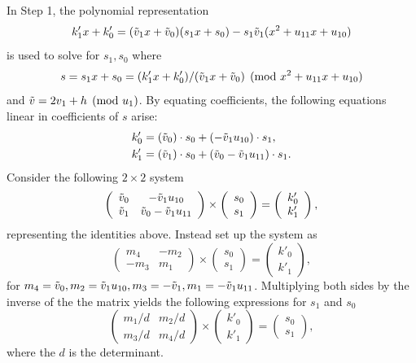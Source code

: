 In Step 1, the polynomial representation $$ k'_1x + k'_0 =
(\tilde{v}_1x + \tilde{v}_0)(s_1x + s_0) - s_1\tilde{v}_1(x^2 + u_{11}x + u_{10})$$ is used to
solve for $s_1,s_0$ where $$s = s_1x + s_0 = (k'_1x + k'_0)/(\tilde{v}_1x + \tilde{v}_0)
\pmod{x^2 + u_{11}x + u_{10}}$$ and $\tilde{v} = 2v_1 + h \pmod{u_1}$. By equating
coefficients, the following equations linear in coefficients of $s$ arise:  
\begin{align*} k'_0 &=
(\tilde{v}_0) \cdot s_0 + (-\tilde{v}_1u_{10}) \cdot s_1, \\
k'_1 &= (\tilde{v}_1) \cdot s_0 + (\tilde{v}_0 - \tilde{v}_1u_{11}) \cdot s_1.
\end{align*}
Consider the following $2 \times 2$ system $$ \left( \begin{array}{cc}
\tilde{v}_0 & -\tilde{v}_1u_{10}   \\
\tilde{v}_1 & \tilde{v}_0 -\tilde{v}_1u_{11}   \end{array} \right) \times \left( \begin{array}{c}
s_0   \\
s_1   \end{array} \right) = \left( \begin{array}{c}
k'_0   \\
k'_1   \end{array} \right), $$  representing the identities above. Instead 
set up the system  as $$ \left( \begin{array}{cc}
m_4 & -m_2   \\
-m_3 & m_1   \end{array} \right) \times \left( \begin{array}{c}
s_0   \\
s_1   \end{array} \right) = \left( \begin{array}{c}
k'_0   \\
k'_1   \end{array} \right),$$ for $m_4 = \tilde{v}_0, m_2 = \tilde{v}_1u_{10}, m_3 = -\tilde{v}_1,
m_1 = -\tilde{v}_1u_{11}$. Multiplying both sides by the inverse of the the matrix
yields the following expressions for $s_1$ and $s_0$ $$ \left( \begin{array}{cc}
m_1/d & m_2/d   \\
m_3/d & m_4/d   \end{array} \right) \times \left( \begin{array}{c}
k'_0   \\
k'_1   \end{array} \right) = \left( \begin{array}{c}
s_0   \\
s_1   \end{array} \right),$$ where the $d$ is the determinant.
